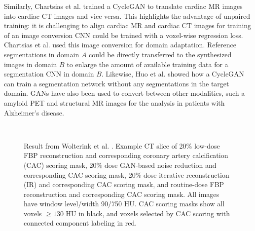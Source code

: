 \documentclass{article}
\begin{document}
Similarly, Chartsias et al. \cite{Char17} trained a CycleGAN to translate cardiac MR images into cardiac CT images and vice versa. This highlights the advantage of unpaired training: it is challenging to align cardiac MR and cardiac CT images for training of an image conversion CNN could be trained with a voxel-wise regression loss. Chartsias et al. used this image conversion for domain adaptation. Reference segmentations in domain $A$ could be directly transferred to the synthesized images in domain $B$ to enlarge the amount of available training data for a segmentation CNN in domain $B$. Likewise, Huo et al. \cite{huo2018adversarial} showed how a CycleGAN can train a segmentation network without any segmentations in the target domain. GANs have also been used to convert between other modalities, such a amyloid PET and structural MR images \cite{Choi17} for the analysis in patients with Alzheimer's disease.


\begin{figure}
\centering
{} 
\\
\caption{Result from Wolterink et al. \cite{Wolt17}. Example CT slice of \protect{} 20\% low-dose FBP reconstruction and \protect{} corresponding coronary artery calcification (CAC) scoring mask, \protect{} 20\% dose GAN-based noise reduction and \protect{} corresponding CAC scoring mask, 20\% dose iterative reconstruction (IR) and \protect{} corresponding CAC scoring mask, and \protect{} routine-dose FBP reconstruction and \protect{} corresponding CAC scoring mask. All images have window level/width 90/750 HU. CAC scoring masks show all voxels $\geq 130$ HU in black, and voxels selected by CAC scoring with connected component labeling in red.}
\label{fig:vivoexamples}
\end{figure}
\end{document}
